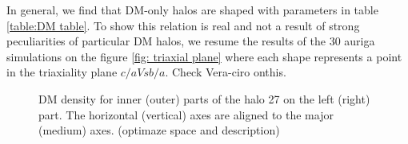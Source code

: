 \documentclass[a4paper,fleqn,usenatbib]{mnras}
\begin{document}
In general, we find that DM-only halos are shaped with parameters in table \ref{table:DM table}. To show this relation is real and not a result of strong peculiarities of particular DM halos, we resume the results of the 30 auriga simulations on the figure \ref{fig: triaxial plane} where each shape represents a point in the triaxiality plane $c/a Vs b/a$. Check Vera-ciro onthis.\\

 

\begin{figure}
  \centering
  \hfill
  \hfill
  \caption{DM density for inner (outer) parts of the halo 27 on the left (right) part. The horizontal (vertical) axes are aligned to the major (medium) axes. (optimaze space and description) }
  \label{fig:slices}
\end{figure}
\end{document}
